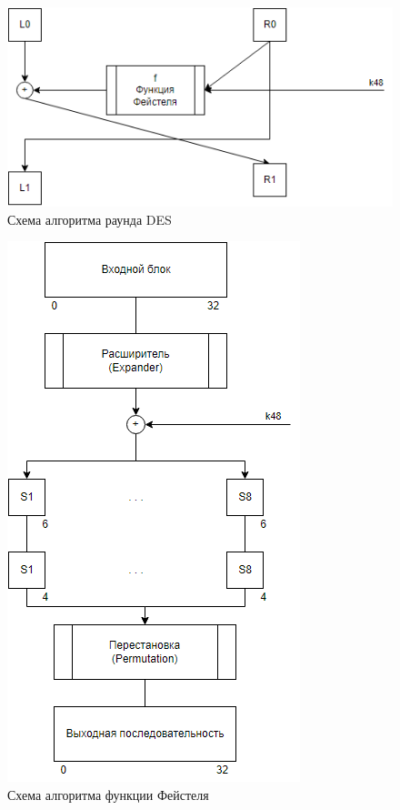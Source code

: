 \begin{figure}[ht!]
	\centering
	\includegraphics[width=0.6\linewidth]{img/round.png}
	\caption{Схема алгоритма раунда DES}
	\label{fig:des-round}
\end{figure}

\clearpage

\begin{figure}[ht!]
	\centering
	\includegraphics[width=0.5\linewidth]{img/function.png}
	\caption{Схема алгоритма функции Фейстеля}
	\label{fig:des-f}
\end{figure}

